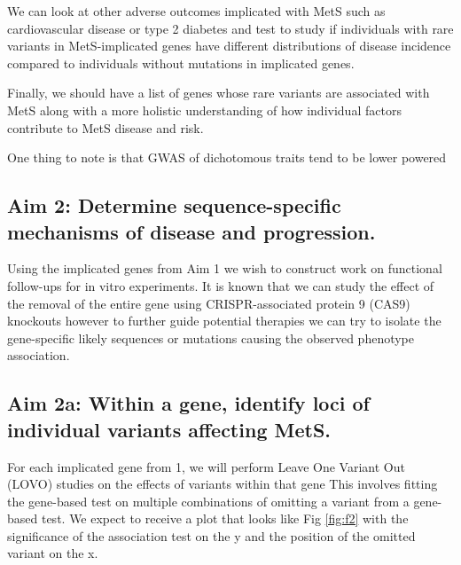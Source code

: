 \documentclass[11pt]{article}
\begin{document}
We can look at other adverse outcomes implicated with MetS such as cardiovascular disease or type 2 diabetes and test to study if individuals with rare variants in MetS-implicated genes have different distributions of disease incidence compared to individuals without mutations in implicated genes. 

Finally, we should have a list of genes whose rare variants are associated with MetS along with a more holistic understanding of how individual factors contribute to MetS disease and risk.

One thing to note is that GWAS of dichotomous traits tend to be lower powered

\subsection*{Aim 2: Determine sequence-specific mechanisms of disease and progression.}

Using the implicated genes from Aim 1 we wish to construct work on functional follow-ups for in vitro experiments. It is known that we can study the effect of the removal of the entire gene using CRISPR-associated protein 9 (CAS9) knockouts however to further guide potential therapies we can try to isolate the gene-specific likely sequences or mutations causing the observed phenotype association.

\subsection*{Aim 2a: Within a gene, identify loci of individual variants affecting MetS.} 

For each implicated gene from 1, we will perform Leave One Variant Out (LOVO) studies on the effects of variants within that gene This involves fitting the gene-based test on multiple combinations of omitting a variant from a gene-based test. We expect to receive a plot that looks like Fig \ref{fig:f2} with the significance of the association test on the y and the position of the omitted variant on the x.
\end{document}
